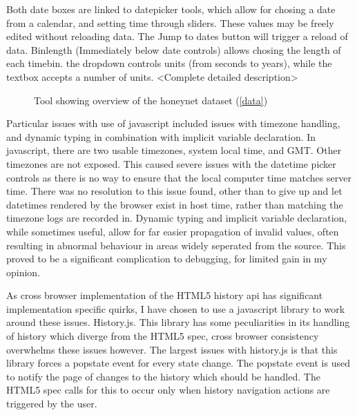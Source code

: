 Both date boxes are linked to datepicker tools, which allow for chosing a date from a calendar, and setting time through sliders. These values may be freely edited without reloading data. The Jump to dates button will trigger a reload of data. 
Binlength (Immediately below date controls) allows chosing the length of each timebin. the dropdown controls units (from seconds to years), while the textbox accepts a number of units.
<Complete detailed description>
\begin{figure}[h!]
\caption{\protect\label{overview}Tool showing overview of the honeynet dataset (\ref{data})}
\end{figure}

Particular issues with use of javascript included issues with timezone handling, and dynamic typing in combination with implicit variable declaration. In javascript, there are two usable timezones, system local time, and GMT. Other timezones are not exposed. This caused severe issues with the datetime picker controls as there is no way to ensure that the local computer time matches server time. There was no resolution to this issue found, other than to give up and let datetimes rendered by the browser exist in host time, rather than matching the timezone logs are recorded in. 
Dynamic typing and implicit variable declaration, while sometimes useful, allow for far easier propagation of invalid values, often resulting in abnormal behaviour in areas widely seperated from the source. This proved to be a significant complication to debugging, for limited gain in my opinion. 

As cross browser implementation of the HTML5 history api has significant implementation specific quirks, I have chosen to use a javascript library to work around these issues. History.js. This library has some peculiarities in its handling of history which diverge from the HTML5 spec, cross browser consistency overwhelms these issues however.  The largest issues with history.js is that this library forces a popstate event for every state change. The popstate event is used to notify the page of changes to the history which should be handled. The HTML5 spec calls for this to occur only when history navigation actions are triggered by the user.

